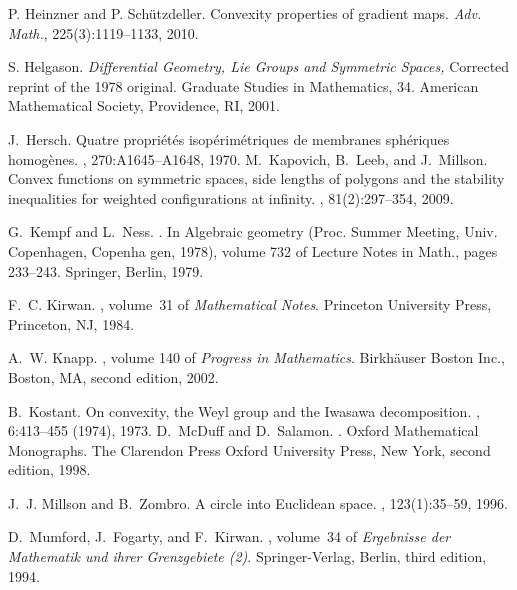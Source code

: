 \documentclass[leqno,11pt, a4]{amsart}
\theoremstyle{named}
\begin{document}
\begin{thebibliography}{10}
P. Heinzner and P. Sch\"utzdeller. \newblock
Convexity properties of gradient maps.
\newblock \emph{Adv. Math.},  225(3):1119--1133, 2010.

S. Helgason. \newblock
{\em Differential Geometry, Lie Groups and Symmetric Spaces,}
\newblock Corrected reprint of the 1978 original. Graduate Studies in Mathematics, 34. American Mathematical Society, Providence, RI, 2001.

 J.~Hersch.  \newblock Quatre propri\'et\'es
  isop\'erim\'etriques de membranes sph\'eriques homog\`enes.
  , 270:A1645--A1648,
  1970.
 M.~Kapovich, B.~Leeb, and
  J.~Millson.  \newblock Convex functions on symmetric spaces, side
  lengths of polygons and the stability inequalities for weighted
  configurations at infinity.  ,
  81(2):297--354, 2009.
  
   G.~Kempf and L.~Ness. . \newblock In Algebraic geometry (Proc. Summer Meeting, Univ. Copenhagen, Copenha
gen, 1978), volume 732 of Lecture Notes in Math., pages 233--243. Springer, Berlin, 1979.
  

 F.~C. Kirwan.  , volume~31 of {\em
    Mathematical Notes}.  \newblock Princeton University Press,
  Princeton, NJ, 1984.

A.~W. Knapp.
, volume 140 of {\em Progress
  in Mathematics}.
\newblock Birkh\"auser Boston Inc., Boston, MA, second edition, 2002.

 B.~Kostant.  \newblock On convexity, the
  {W}eyl group and the {I}wasawa decomposition.  , 6:413--455 (1974), 1973.
 D.~McDuff and D.~Salamon.
  .  \newblock
  Oxford Mathematical Monographs. The Clarendon Press Oxford
  University Press, New York, second edition, 1998.

 J.~J. Millson and B.~Zombro.  \newblock A 
  circle into {E}uclidean space.  ,
  123(1):35--59, 1996.

 D.~Mumford, J.~Fogarty, and F.~Kirwan.
  , volume~34 of {\em
    Ergebnisse der Mathematik und ihrer Grenzgebiete (2)}.  \newblock
  Springer-Verlag, Berlin, third edition, 1994.


\end{thebibliography}
\end{document}
